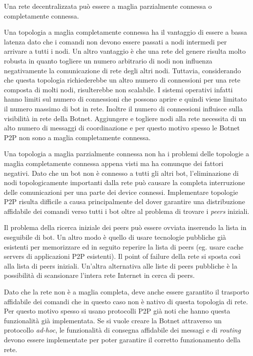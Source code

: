 Una rete decentralizzata può essere a maglia parzialmente connessa o completamente connessa.

Una topologia a maglia completamente connessa ha il vantaggio di essere a bassa latenza dato che i comandi non devono essere passati a nodi intermedi per arrivare a tutti i nodi. Un altro vantaggio è che una rete del genere risulta molto robusta in quanto togliere un numero arbitrario di nodi non influenza negativamente la comunicazione di rete degli altri nodi. Tuttavia, considerando che questa topologia richiederebbe un altro numero di connessioni per una rete composta di molti nodi, risulterebbe non scalabile. I sistemi operativi infatti hanno limiti sul numero di connessioni che possono aprire e quindi viene limitato il numero massimo di bot in rete. Inoltre il numero di connessioni influisce sulla visibilità in rete della Botnet. Aggiungere e togliere nodi alla rete necessita di un alto numero di messaggi di coordinazione e per questo motivo spesso le Botnet P2P non sono a maglia completamente connessa.

Una topologia a maglia parzialmente connessa non ha i problemi delle topologie a maglia completamente connessa appena visti ma ha comunque dei fattori negativi. 
Dato che un bot non è connesso a tutti gli altri bot, l'eliminazione di nodi topologicamente importanti dalla rete può causare la completa interruzione delle comunicazioni per una parte dei device connessi.
Implementare topologie P2P risulta difficile a causa principalmente del dover garantire una distribuzione affidabile dei comandi verso tutti i bot oltre al problema di trovare i \textit{peers} iniziali.

Il problema della ricerca iniziale dei peers può essere ovviata inserendo la lista in eseguibile di bot. Un altro modo è quello di usare tecnologie pubbliche già esistenti per memorizzare ed in seguito reperire la lista di peers (eg. usare cache servers di applicazioni P2P esistenti). Il point of failure della rete si sposta così alla lista di peers iniziali. Un'altra alternativa alle liste di peers pubbliche è la possibilità di scansionare l'intera rete Internet in cerca di peers.

Dato che la rete non è a maglia completa, deve anche essere garantito il trasporto affidabile dei comandi che in questo caso non è nativo di questa topologia di rete. Per questo motivo spesso si usano protocolli P2P già noti che hanno questa funzionalità già implementata. Se si vuole creare la Botnet attraverso un protocollo \textit{ad-hoc}, le funzionalità di consegna affidabile dei messagi e di \textit{routing} devono essere implementate per poter garantire il corretto funzionamento della rete.

